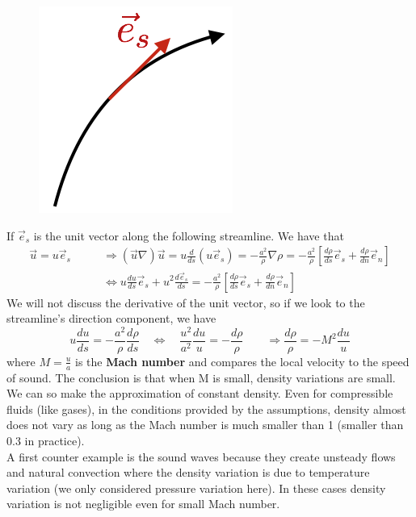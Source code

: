 		\begin{figure}
		\vspace{-5mm}
		\includegraphics[scale=0.4]{ch1/11}
		\end{figure}
		If $\vec{e}_s$ is the unit vector along the following streamline. We have that 
		\begin{equation}
		\begin{aligned}
			\vec{u}= u \vec{e}_s 
			\qquad &\Rightarrow (\vec{u}\nabla)\vec{u} = u \frac{d}{ds}(u\vec{e}_s) = -\frac{a^2}{\rho} \nabla \rho = -\frac{a^2}{\rho}\left[ \frac{d\rho}{ds}\vec{e}_s + \frac{d\rho}{dn} \vec{e}_n \right]\\
			&\Leftrightarrow u\frac{du}{ds}\vec{e}_s + u^2\frac{d\vec{e}_s}{ds} =  -\frac{a^2}{\rho}\left[ \frac{d\rho}{ds}\vec{e}_s + \frac{d\rho}{dn} \vec{e}_n \right]
			\end{aligned}
		\end{equation}
		We will not discuss the derivative of the unit vector, so if we look to the streamline's direction component, we have
		\begin{equation}
			u\frac{du}{ds} = -\frac{a^2}{\rho} \frac{d\rho}{ds} \quad \Leftrightarrow \quad \frac{u^2}{a^2}\frac{du}{u} = - \frac{d\rho}{\rho} \qquad \Rightarrow \frac{d\rho}{\rho} = -M^2 \frac{du}{u}
		\end{equation}
		where $M = \frac{u}{a}$ is the \textbf{Mach number} and compares the local velocity to the speed of sound. The conclusion is that when M is small, density variations are small. We can so make the approximation of constant density. Even for compressible fluids (like gases), in the conditions provided by the assumptions, density almost does not vary as long as the Mach number is much smaller than 1 (smaller than 0.3 in practice). \\
		A first counter example is the sound waves because they create unsteady flows and natural convection where the density variation is due to temperature variation (we only considered pressure variation here). In these cases density variation is not negligible even for small Mach number. 
		
